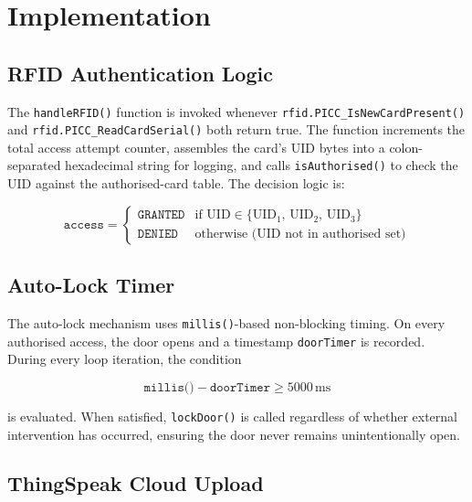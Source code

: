 \documentclass[12pt,a4paper]{article}
\begin{document}
\section{Implementation}
\label{sec:implementation}

\subsection{RFID Authentication Logic}

The \texttt{handleRFID()} function is invoked whenever
\texttt{rfid.PICC\_IsNewCardPresent()} and
\texttt{rfid.PICC\_ReadCardSerial()} both return true. The function
increments the total access attempt counter, assembles the card's
UID bytes into a colon-separated hexadecimal string for logging, and
calls \texttt{isAuthorised()} to check the UID against the
authorised-card table. The decision logic is:

\begin{equation}
\texttt{access} =
\begin{cases}
  \texttt{GRANTED} & \text{if } \text{UID} \in \{\text{UID}_1,\,\text{UID}_2,\,\text{UID}_3\} \\[4pt]
  \texttt{DENIED}  & \text{otherwise (UID not in authorised set)}
\end{cases}
\label{eq:auth}
\end{equation}

\subsection{Auto-Lock Timer}

The auto-lock mechanism uses \texttt{millis()}-based non-blocking
timing. On every authorised access, the door opens and a timestamp
\texttt{doorTimer} is recorded. During every loop iteration, the
condition

\begin{equation}
\texttt{millis()} - \texttt{doorTimer} \geq 5000\,\text{ms}
\label{eq:autolock}
\end{equation}

is evaluated. When satisfied, \texttt{lockDoor()} is called
regardless of whether external intervention has occurred,
ensuring the door never remains unintentionally open.

\subsection{ThingSpeak Cloud Upload}
\end{document}
